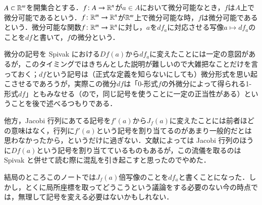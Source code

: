 \begin{defi}
$A \subset \mathbb{R}^m$を開集合とする．$f \colon A \to \mathbb{R}^n$が$a \in A$において微分可能なとき，$f$は$A$上で微分可能であるという．$f \colon \mathbb{R}^m \to \mathbb{R}^n$が$\mathbb{R}^m$上で微分可能な時，$f$は微分可能であるという．微分可能な関数$f \colon \mathbb{R}^m \to \mathbb{R}^n$に対し，$a$を$df_a$に対応させる写像$a \mapsto df_a$のことを$df$と書いて，$f$の微分という．
\end{defi}

\begin{dig}
微分の記号を Spivak における$Df(a)$から$df_a$に変えたことには一定の意図があるが，このタイミングではきちんとした説明が難しいので大雑把なことだけを言っておく；$df$という記号は（正式な定義を知らないにしても）微分形式を思い起こさせるであろうが，実際この微分$df$は「0-形式$f$の外微分によって得られる1-形式$df$」ともみなせる（ので，同じ記号を使うことに一定の正当性がある）ということを後で述べるつもりである．

他方，Jacobi 行列にあてる記号を$f'(a)$から$J_f(a)$に変えたことには前者ほどの意味はなく，行列に$f'(a)$という記号を割り当てるのがあまり一般的だとは思わなかったから，というだけに過ぎない．文献によっては Jacobi 行列のほうに$Df(a)$という記号を割り当てているものもあるが，この流儀を取るのは Spivak と併せて読む際に混乱を引き起こすと思ったのでやめた．

結局のところこのノートでは$J_f(a)$倍写像のことを$df_a$と書くことになった．しかし，とくに局所座標を取ってどうこうという議論をする必要のない今の時点では，無理して記号を変える必要はないかもしれない．
\end{dig}


